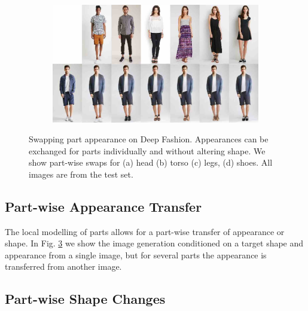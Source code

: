 \begin{figure}[htp]
\begin{subfigure}{0.49\linewidth}
		\label{fig:part3_21}
		\end{subfigure}
		\begin{subfigure}{0.49\linewidth}
		\centering
		\includegraphics[trim={0cm 0cm 0cm 0cm},clip, width=1.\linewidth]{fig/factor/part6_30}\caption{}
		\label{fig:part3_30}
		\end{subfigure}
		\caption{Swapping part appearance on Deep Fashion. Appearances can be exchanged for parts individually and without altering shape. We show part-wise swaps for (a) head (b) torso (c) legs, (d) shoes. All images are from the test set.}
		\label{fig:partswaps}
	\end{figure}

	\subsection{Part-wise Appearance Transfer}

	The local modelling of parts allows for a part-wise transfer of appearance or shape. In Fig. \ref{fig:partswaps} we show the image generation conditioned on a target shape and appearance from a single image, but for several parts the appearance is transferred from another image.

	\subsection{Part-wise Shape Changes}

